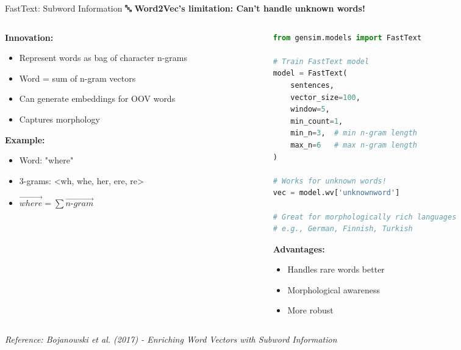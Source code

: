 \documentclass[aspectratio=169]{beamer}
\begin{document}
\begin{frame}[fragile,shrink=10]{FastText: Subword Information 🔤}
\textbf{Word2Vec's limitation: Can't handle unknown words!}

\vspace{1em}

\begin{columns}[T]
\begin{column}{0.48\textwidth}
\textbf{Innovation:}
\begin{itemize}\setlength{\itemsep}{0pt}
    \item Represent words as bag of character n-grams
    \item Word = sum of n-gram vectors
    \item Can generate embeddings for OOV words
    \item Captures morphology
\end{itemize}

\vspace{0.5em}
\textbf{Example:}
\begin{itemize}\setlength{\itemsep}{0pt}
    \item Word: "where"
    \item 3-grams: <wh, whe, her, ere, re>
    \item $\vec{where} = \sum \vec{n\text{-}gram}$
\end{itemize}
\end{column}

\begin{column}{0.48\textwidth}
\begin{lstlisting}[language=Python]
from gensim.models import FastText

# Train FastText model
model = FastText(
    sentences,
    vector_size=100,
    window=5,
    min_count=1,
    min_n=3,  # min n-gram length
    max_n=6   # max n-gram length
)

# Works for unknown words!
vec = model.wv['unknownword']

# Great for morphologically rich languages
# e.g., German, Finnish, Turkish
\end{lstlisting}

\vspace{0.5em}
\textbf{Advantages:}
\begin{itemize}\setlength{\itemsep}{0pt}
    \item Handles rare words better
    \item Morphological awareness
    \item More robust
\end{itemize}
\end{column}
\end{columns}

\vspace{0.5em}
\small
\textit{Reference: Bojanowski et al. (2017) - Enriching Word Vectors with Subword Information}
\end{frame}
\end{document}
